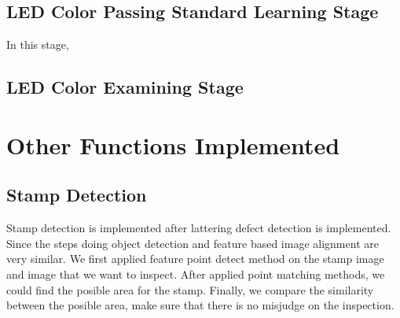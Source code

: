 	\subsection{LED Color Passing Standard Learning Stage}
		In this stage, 

	\subsection{LED Color Examining Stage}


\section{Other Functions Implemented}
	\subsection{Stamp Detection}
		Stamp detection is implemented after lattering defect detection is implemented.
		Since the steps doing object detection and feature based image alignment are very similar.
		We first applied feature point detect method on the stamp image and image that we want to inspect.
		After applied point matching methods, we could find the posible area for the stamp.
		Finally, we compare the similarity between the posible area, make sure that there is no misjudge on the inspection.